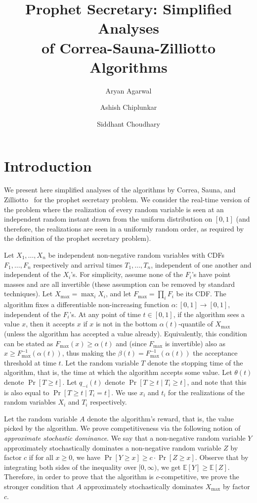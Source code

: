 \documentclass[10pt, letterpaper, twoside]{article}
\title{Prophet Secretary: Simplified Analyses\\ of Correa-Sauna-Zilliotto Algorithms}
\author{Aryan Agarwal \and Ashish Chiplunkar \and Siddhant Choudhary}
\date{}
\begin{document}
\maketitle

\section{Introduction}

We present here simplified analyses of the algorithms by Correa, Sauna, and Zilliotto~\cite{CorreaSZ19} for the prophet secretary problem. We consider the real-time version of the problem where the realization of every random variable is seen at an independent random instant drawn from the uniform distribution on $[0,1]$ (and therefore, the realizations are seen in a uniformly random order, as required by the definition of the prophet secretary problem).

Let $X_1,\ldots,X_n$ be independent non-negative random variables with CDFs $F_1,\ldots,F_n$ respectively and arrival times $T_1,\ldots,T_n$, independent of one another and independent of the $X_i$'s. For simplicity, assume none of the $F_i$'s have point masses and are all invertible (these assumption can be removed by standard techniques). Let $X_{\max}=\max_iX_i$, and let $F_{\max}=\prod_iF_i$ be its CDF. The algorithm fixes a differentiable non-increasing function $\alpha:[0,1]\longrightarrow[0,1]$, independent of the $F_i$'s. At any point of time $t\in[0,1]$, if the algorithm sees a value $x$, then it accepts $x$ if $x$ is not in the bottom $\alpha(t)$-quantile of $X_{\max}$ (unless the algorithm has accepted a value already). Equivalently, this condition can be stated as $F_{\max}(x)\geq\alpha(t)$ and (since $F_{\max}$ is invertible) also as $x\geq F_{\max}^{-1}(\alpha(t))$, thus making the $\beta(t)=F_{\max}^{-1}(\alpha(t))$ the acceptance threshold at time $t$. Let the random variable $T$ denote the stopping time of the algorithm, that is, the time at which the algorithm accepts some value. Let $\theta(t)$ denote $\Pr[T\geq t]$. Let $q_{-i}(t)$ denote $\Pr[T\geq t\mid T_i\geq t]$, and note that this is also equal to $\Pr[T\geq t\mid T_i=t]$. We use $x_i$ and $t_i$ for the realizations of the random variables $X_i$ and $T_i$ respectively.

Let the random variable $A$ denote the algorithm's reward, that is, the value picked by the algorithm. We prove competitiveness via the following notion of \textit{approximate stochastic dominance}. We say that a non-negative random variable $Y$ approximately stochastically dominates a non-negative random variable $Z$ by factor $c$ if for all $x\geq0$, we have $\Pr[Y\geq x]\geq c\cdot\Pr[Z\geq x]$. Observe that by integrating both sides of the inequality over $[0,\infty)$, we get $\mathbb{E}[Y]\geq\mathbb{E}[Z]$. Therefore, in order to prove that the algorithm is $c$-competitive, we prove the stronger condition that $A$ approximately stochastically dominates $X_{\max}$ by factor $c$.
\end{document}
